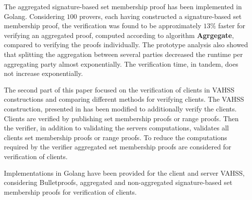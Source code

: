 The aggregated signature-based set membership proof has been implemented in Golang. Considering $100$ provers, each having constructed a signature-based set membership proof, the verification was found to be approximately $13\%$ faster for verifying an aggregated proof, computed according to algorithm \textbf{Agrgegate}, compared to verifying the proofs individually.  The prototype analysis also showed that splitting the aggregation between several parties decreased the runtime per aggregating party almost exponentially. The verification time, in tandem, does not increase exponentially.  

The second part of this paper focused on the verification of clients in VAHSS constructions and comparing different methods for verifying clients.  The VAHSS construction, presented in \cite{SumItUp} has been modified to additionally verify the clients. Clients are verified by publishing set membership proofs or range proofs. Then the verifier, in addition to validating the servers computations, validates all clients set membership proofs or range proofs. To reduce the computations required by the verifier aggregated set membership proofs are considered for verification of clients.

Implementations in Golang have been provided for the client and server VAHSS, considering Bulletproofs, aggregated and non-aggregated signature-based set membership proofs for verification of clients.




